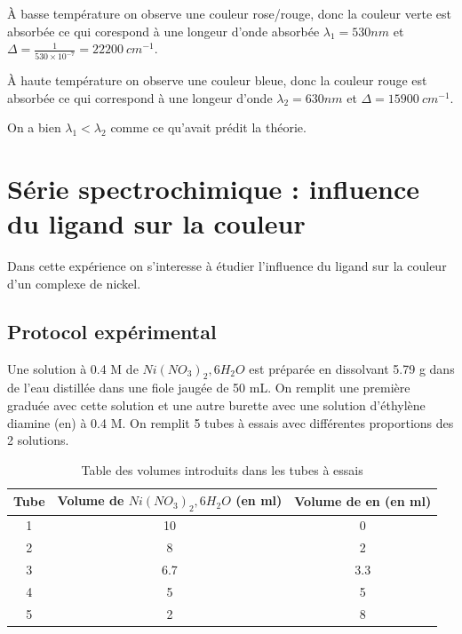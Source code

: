 \documentclass[12pt]{article}
\begin{document}
À basse température on observe une couleur rose/rouge, donc la couleur verte est absorbée ce qui corespond à une longeur d'onde absorbée $\lambda_1=530 nm$ et $\Delta=\frac{1}{530 \times 10^{-7}}=22200 \ cm^{-1}$.

À haute température on observe une couleur bleue, donc la couleur rouge est absorbée ce qui correspond à une longeur d'onde $\lambda_2=630 nm$ et $\Delta=15 900 \ cm^{-1}$.

On a bien $\lambda_1<\lambda_2$ comme ce qu'avait prédit la théorie.

\section{Série spectrochimique : influence du ligand sur la couleur}

Dans cette expérience on s'interesse à étudier l'influence du ligand sur la couleur d'un complexe de nickel.

\subsection{Protocol expérimental}

Une solution à 0.4 M de $Ni(NO_3)_2,6H_2O$ est préparée en dissolvant 5.79 g dans de l'eau distillée dans une fiole jaugée de 50 mL.
On remplit une première graduée avec cette solution et une autre burette avec une solution d'éthylène diamine (en) à 0.4 M.
On remplit 5 tubes à essais avec différentes proportions des 2 solutions.

\begin{table}[h!]
    \begin{center}
        \begin{tabular}{|c|c|c|}
            \hline
            Tube & Volume de $Ni(NO_3)_2,6H_2O$ (en ml) & Volume de en (en ml) \\
            \hline
            1 & 10 & 0 \\
            2 & 8 & 2 \\
            3 & 6.7 & 3.3 \\
            4 & 5 & 5 \\
            5 & 2 & 8 \\
            \hline
        \end{tabular}
        \caption{Table des volumes introduits dans les tubes à essais}
        \label{table1:volume}
    \end{center}
\end{table}
\end{document}
